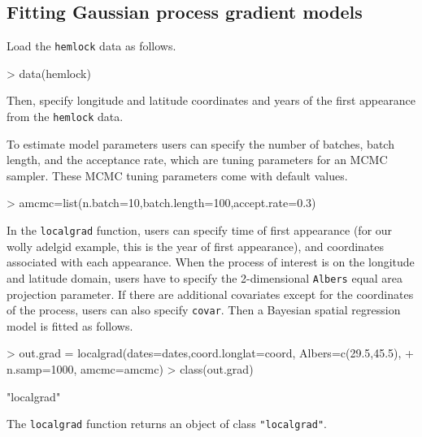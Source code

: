 \documentclass{article}
\newcommand{\code}[1]{{\tt #1}}
\begin{document}
\subsection{Fitting Gaussian process gradient models}
Load the {\tt hemlock} data as follows.
\begin{Schunk}
\begin{Sinput}
> data(hemlock)
\end{Sinput}
\end{Schunk}
Then, specify longitude and latitude coordinates and years of the first appearance from the {\tt hemlock} data.
\begin{Schunk}
\end{Schunk}
To estimate model parameters users can specify the number of batches, batch length, and the acceptance rate, which are tuning parameters for an MCMC sampler. These MCMC tuning parameters come with default values.
\begin{Schunk}
\begin{Sinput}
> amcmc=list(n.batch=10,batch.length=100,accept.rate=0.3)
\end{Sinput}
\end{Schunk}

In the \code{localgrad} function, users can specify  time of first appearance (for our wolly adelgid example, this is the year of first appearance), and coordinates associated with each appearance. When the process of interest is on the longitude and latitude domain, users have to specify the 2-dimensional \code{Albers} equal area projection parameter. If there are additional covariates except for the coordinates of the process, users can also specify \code{covar}. Then a Bayesian spatial regression model is fitted as follows.

\begin{Schunk}
\begin{Sinput}
> out.grad = localgrad(dates=dates,coord.longlat=coord, Albers=c(29.5,45.5),
+                      n.samp=1000, amcmc=amcmc)
> class(out.grad)
\end{Sinput}
\begin{Soutput}
[1] "localgrad"
\end{Soutput}
\end{Schunk}
The \code{localgrad} function returns an object of class \code{"localgrad"}.
\end{document}
